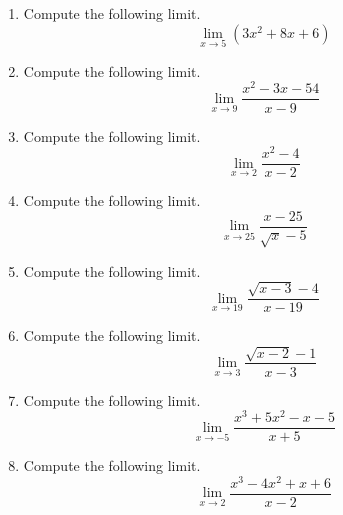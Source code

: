 \documentclass{article}
\begin{document}
\ActivityTitle[class=Calculus I, number=1, name=Limits]

\begin{enumerate}
\item Compute the following limit. \[ \lim_{x \rightarrow 5} \left( 3 x^2 + 8 x + 6 \right) \]



  
\vspace{5cm}

\item Compute the following limit. \[ \displaystyle\lim_{x \rightarrow 9} \frac{x^2 - 3x - 54}{x - 9} \]



  
\vspace{5cm}

\item Compute the following limit. \[ \lim_{x \rightarrow 2} \frac{x^2 - 4}{x - 2} \]



  
\vspace{5cm}

\item Compute the following limit. \[ \lim_{x \rightarrow 25} \frac{x - 25}{\sqrt{x} - 5} \]



  
\vspace{5cm}

\item Compute the following limit. \[ \lim_{x \rightarrow 19} \frac{\sqrt{x - 3} - 4}{x - 19} \]



  
\vspace{5cm}

\item Compute the following limit. \[ \lim_{x \rightarrow 3} \frac{\sqrt{x - 2} - 1}{x - 3} \]



  
\vspace{5cm}

\item Compute the following limit. \[ \lim_{x \rightarrow -5} \frac{x^3 + 5x^2 - x - 5}{x + 5} \]



  
\vspace{5cm}

\item Compute the following limit. \[ \lim_{x \rightarrow 2} \frac{x^3 - 4x^2 + x + 6}{x - 2} \]



  
\vspace{5cm}
\end{enumerate}
\end{document}
